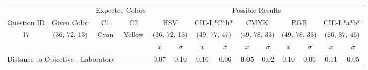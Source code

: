 %
\begin{table}[H]
  \resizebox{\textwidth}{!} {
  \begin{tabular}{lccccccccccccc}
    \hline
    \multicolumn{1}{c}{}                              &                                      & \multicolumn{2}{c}{Expected Colors}                   & \multicolumn{10}{c}{Possible Results}                                                                                                                                                                                                                                                                                        \\ \cline{3-14}
    \multicolumn{1}{c}{\multirow{-2}{*}{Question ID}} & \multirow{-2}{*}{Given Color}        & C1                       & C2                         & \multicolumn{2}{c}{HSV}                                        & \multicolumn{2}{c}{CIE-L*C*h*}                                 & \multicolumn{2}{c}{CMYK}                                       & \multicolumn{2}{c}{RGB}                                        & \multicolumn{2}{c}{CIE-L*a*b*}                                 \\ \hline
    \multicolumn{1}{c}{17}                             & \cellcolor[HTML]{00FF00}(36, 72, 13) & \multicolumn{1}{c|}{Cyan} & \multicolumn{1}{c|}{Yellow}  & \multicolumn{2}{c|}{\cellcolor[HTML]{00FF00}(36, 72, 13)}      & \multicolumn{2}{c|}{\cellcolor[HTML]{6EFFA3}(49, 77, 47)}       & \multicolumn{2}{c|}{\cellcolor[HTML]{80FF80}(49, 78, 33)}       & \multicolumn{2}{c|}{\cellcolor[HTML]{80FF80}(49, 78, 33)}       & \multicolumn{2}{c|}{\cellcolor[HTML]{C4FF9E}(66, 87, 46)}       \\ \hline
                                                      & \multicolumn{1}{l}{}                 & \multicolumn{1}{l}{}     & \multicolumn{1}{l}{}       & \multicolumn{1}{c}{$\tilde{x}$} & \multicolumn{1}{c}{$\sigma$} & \multicolumn{1}{c}{$\tilde{x}$} & \multicolumn{1}{c}{$\sigma$} & \multicolumn{1}{c}{$\tilde{x}$} & \multicolumn{1}{c}{$\sigma$} & \multicolumn{1}{c}{$\tilde{x}$} & \multicolumn{1}{c}{$\sigma$} & \multicolumn{1}{c}{$\tilde{x}$} & \multicolumn{1}{c}{$\sigma$} \\ \hline
    \multicolumn{4}{l}{Distance to Objective - Laboratory}                                                                                           & \multicolumn{1}{|c}{0.07}       & \multicolumn{1}{c|}{0.10}    & \multicolumn{1}{|c}{0.16}       & \multicolumn{1}{c|}{0.06}    & \multicolumn{1}{|c}{\textbf{0.05}}       & \multicolumn{1}{c|}{0.02}    & \multicolumn{1}{|c}{0.10}       & \multicolumn{1}{c|}{0.06}    & \multicolumn{1}{|c}{0.11}       & \multicolumn{1}{c|}{0.05}    \\

\end{tabular}}
\end{table}
